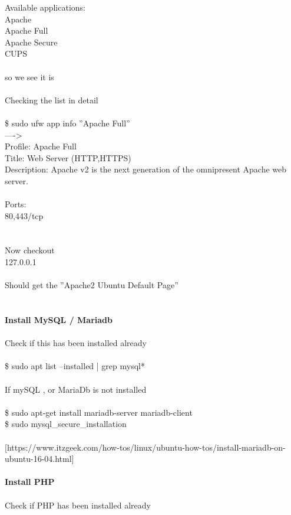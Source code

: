 \documentclass[10pt,a4paper]{article}
\begin{document}
{{{{{{{{{{{{{{{{Available applications:\\
  Apache\\
  Apache Full\\
  Apache Secure\\
  CUPS\\
\\
so we see it is\\
\\
Checking the list in detail\\
\\
\$ sudo ufw app info ''Apache Full'' \\
---->\\
Profile: Apache Full\\
Title: Web Server (HTTP,HTTPS)\\
Description: Apache v2 is the next generation of the omnipresent Apache web\\
server.\\
\\
Ports:\\
  80,443/tcp\\
\\
\\
Now checkout\\
127.0.0.1\\
\\
Should get the ''Apache2 Ubuntu Default Page''\\
\\
\\
\textbf{Install MySQL / Mariadb}}{\large \\
\\
Check if this has been installed already\\
\\
\$ sudo apt list --installed | grep  mysql*\\
\\
If mySQL , or MariaDb is not installed\\
\\
\$ sudo apt-get install mariadb-server mariadb-client\\
\$ sudo mysql\_secure\_installation\\
\\
[https://www.itzgeek.com/how-tos/linux/ubuntu-how-tos/install-mariadb-on-ubuntu-16-04.html}{\large ]\\
\\
\textbf{Install PHP}}{\large \\
\\
Check if PHP has been installed already\\
}}}}}}}}}}}}}}}}
\end{document}
